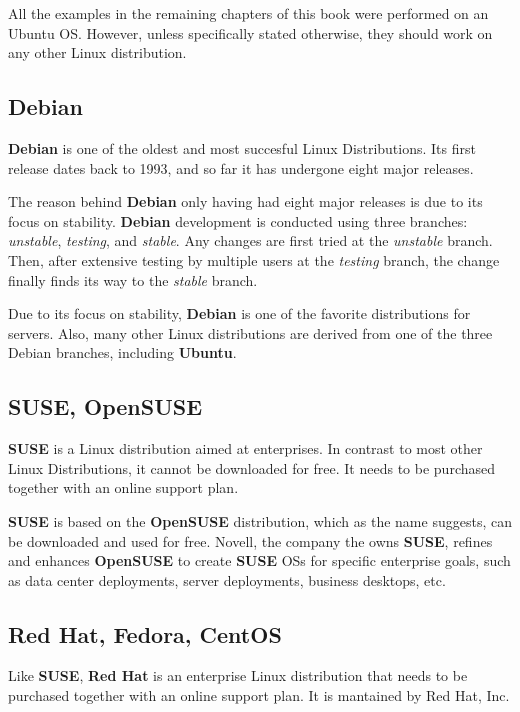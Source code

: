 All the examples in the remaining chapters of this book were performed on an Ubuntu \acs{OS}. However, unless specifically stated otherwise, they should work on any other Linux distribution.


\subsection{Debian}
\textbf{Debian} is one of the oldest and most succesful Linux Distributions. Its first release dates back to 1993, and so far it has undergone eight major releases.

The reason behind \textbf{Debian} only having had eight major releases is due to its focus on stability. \textbf{Debian} development is conducted using three branches: \textit{unstable}, \textit{testing}, and \textit{stable}. Any changes are first tried at the \textit{unstable} branch. Then, after extensive testing by multiple users at the \textit{testing} branch, the change finally finds its way to the \textit{stable} branch.

Due to its focus on stability, \textbf{Debian} is one of the favorite distributions for servers. Also, many other Linux distributions are derived from one of the three Debian branches, including \textbf{Ubuntu}.

\subsection{SUSE, OpenSUSE}
\textbf{SUSE} is a Linux distribution aimed at enterprises. In contrast to most other Linux Distributions, it cannot be downloaded for free. It needs to be purchased together with an online support plan.

\textbf{SUSE} is based on the \textbf{OpenSUSE} distribution, which as the name suggests, can be downloaded and used for free. Novell, the company the owns \textbf{SUSE}, refines and enhances \textbf{OpenSUSE} to create \textbf{SUSE} \acs{OS}s for specific enterprise goals, such as data center deployments, server deployments, business desktops, etc.

\subsection{Red Hat, Fedora, CentOS}
Like \textbf{SUSE}, \textbf{Red Hat} is an enterprise Linux distribution that needs to be purchased together with an online support plan. It is mantained by Red Hat, Inc.

